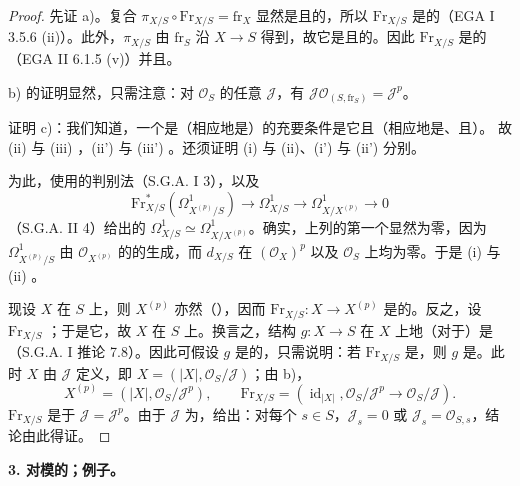 \begin{proof}
先证 a)。复合 $\pi_{X/S}\circ\mathrm{Fr}_{X/S}=\mathrm{fr}_X$ 显然是且的，所以 $\mathrm{Fr}_{X/S}$ 是的（EGA I 3.5.6 (ii)）。此外，$\pi_{X/S}$ 由 $\mathrm{fr}_S$ 沿 $X\to S$ 得到，故它是且的。因此 $\mathrm{Fr}_{X/S}$ 是的（EGA II 6.1.5 (v)）并且。

b) 的证明显然，只需注意：对 $\mathcal O_S$ 的任意 $\mathcal J$，有 $\mathcal J\mathcal O_{(S,\mathrm{fr}_S)}=\mathcal J^p$。

证明 c)：我们知道，一个是（相应地是）的充要条件是它且（相应地是、且）。
故 (ii) 与 (iii) ，(ii') 与 (iii') 。还须证明 (i) 与 (ii)、(i') 与 (ii') 分别。

为此，使用的判别法（S.G.A. I 3），以及
\[
\mathrm{Fr}_{X/S}^{*}(\Omega^1_{X^{(p)}/S})\longrightarrow
\Omega^1_{X/S}\longrightarrow\Omega^1_{X/X^{(p)}}\longrightarrow0
\]
（S.G.A. II 4）给出的 $\Omega^1_{X/S}\simeq\Omega^1_{X/X^{(p)}}$。确实，上列的第一个显然为零，因为 $\Omega^1_{X^{(p)}/S}$ 由 $\mathcal O_{X^{(p)}}$ 的的生成，而 $d_{X/S}$ 在 $(\mathcal O_X)^p$ 以及 $\mathcal O_S$ 上均为零。于是 (i) 与 (ii) 。

现设 $X$ 在 $S$ 上，则 $X^{(p)}$ 亦然（），因而 $\mathrm{Fr}_{X/S}:X\to X^{(p)}$ 是的。反之，设 $\mathrm{Fr}_{X/S}$ ；于是它，故 $X$ 在 $S$ 上。换言之，结构 $g:X\to S$ 在 $X$ 上地（对于）是（S.G.A. I 推论 7.8）。因此可假设 $g$ 是的，只需说明：若 $\mathrm{Fr}_{X/S}$ 是，则 $g$ 是。此时 $X$ 由 $\mathcal J$ 定义，即 $X=(|X|,\mathcal O_S/\mathcal J)$；由 b)，
\[
X^{(p)}=(|X|,\mathcal O_S/\mathcal J^p),\qquad
\mathrm{Fr}_{X/S}=(\operatorname{id}_{|X|},\mathcal O_S/\mathcal J^p\longrightarrow\mathcal O_S/\mathcal J).
\]
$\mathrm{Fr}_{X/S}$ 是于 $\mathcal J=\mathcal J^p$。由于 $\mathcal J$ 为，给出：对每个 $s\in S$，$\mathcal J_s=0$ 或 $\mathcal J_s=\mathcal O_{S,s}$，结论由此得证。
\end{proof}
\textbf{3. 对模的；例子。}

